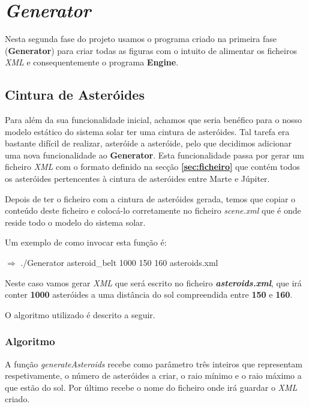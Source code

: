 \documentclass[a4paper]{article}
\begin{document}
\rmfamily

\newpage

\section{\textit{Generator}}

Nesta segunda fase do projeto usamos o programa criado na primeira fase (\textbf{Generator}) para criar todas as figuras com o intuito de alimentar os ficheiros \emph{XML} e consequentemente o programa \textbf{Engine}.

\subsection{Cintura de Asteróides}

Para além da sua funcionalidade inicial, achamos que seria benéfico para o nosso modelo estático do sistema solar ter uma cintura de asteróides. Tal tarefa era bastante difícil de realizar, asteróide a asteróide, pelo que decidimos adicionar uma nova funcionalidade ao \textbf{Generator}. Esta funcionalidade passa por gerar um ficheiro \emph{XML} com o formato definido na secção \textbf{\ref{sec:ficheiro}} que contém todos os asteróides pertencentes à cintura de asteróides entre Marte e Júpiter.

Depois de ter o ficheiro com a cintura de asteróides gerada, temos que copiar o conteúdo deste ficheiro e colocá-lo corretamente no ficheiro \emph{scene.xml} que é onde reside todo o modelo do sistema solar.

Um exemplo de como invocar esta função é:

 \vspace{0.5cm}

$\Rightarrow$ ./Generator asteroid\_belt 1000 150 160 asteroids.xml

 \vspace{0.5cm}

 Neste caso vamos gerar \emph{XML} que será escrito no ficheiro \textbf{\emph{asteroids.xml}}, que irá conter \textbf{1000} asteróides a uma distância do sol compreendida entre \textbf{150} e \textbf{160}.

O algoritmo utilizado é descrito a seguir.

\subsubsection{Algoritmo}
A função \textit{generateAsteroids} recebe como parâmetro três inteiros que representam respetivamente, o número de asteróides a criar, o raio mínimo e o raio máximo a que estão do sol. Por último recebe o nome do ficheiro onde irá guardar o \emph{XML} criado.
\end{document}
